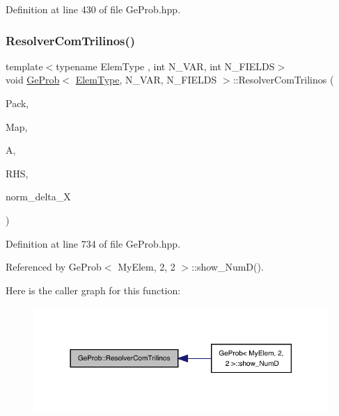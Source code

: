 Definition at line 430 of file Ge\+Prob.\+hpp.

\mbox{\label{classGeProb_a479ff26c0f91f09a7b92cabf9894c64e}} 
\subsubsection{\texorpdfstring{Resolver\+Com\+Trilinos()}{ResolverComTrilinos()}}
{\footnotesize\ttfamily template$<$typename Elem\+Type , int N\+\_\+\+V\+AR, int N\+\_\+\+F\+I\+E\+L\+DS$>$ \\
void \hyperlink{classGeProb}{Ge\+Prob}$<$ \hyperlink{spectral_8h_aaa2c1a7b2d1b12c590d730fe6ac839fa}{Elem\+Type}, N\+\_\+\+V\+AR, N\+\_\+\+F\+I\+E\+L\+DS $>$\+::Resolver\+Com\+Trilinos (\begin{DoxyParamCaption}\item[{const std\+::string}]{Pack,  }\item[{Epetra\+\_\+\+Map}]{Map,  }\item[{Teuchos\+::\+R\+CP$<$ Epetra\+\_\+\+F\+E\+Crs\+Matrix $>$}]{A,  }\item[{Teuchos\+::\+R\+CP$<$ Epetra\+\_\+\+F\+E\+Vector $>$}]{R\+HS,  }\item[{double\+\_\+t \&}]{norm\+\_\+delta\+\_\+X }\end{DoxyParamCaption})}



Definition at line 734 of file Ge\+Prob.\+hpp.



Referenced by Ge\+Prob$<$ My\+Elem, 2, 2 $>$\+::show\+\_\+\+Num\+D().

Here is the caller graph for this function\+:
\nopagebreak
\begin{figure}[H]
\begin{center}
\leavevmode
\includegraphics[width=318pt]{classGeProb_a479ff26c0f91f09a7b92cabf9894c64e_icgraph}
\end{center}
\end{figure}
\mbox{\label{classGeProb_adc17f3e57dab093882ec7f7aebea634f}} 

